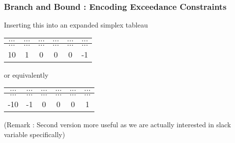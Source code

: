 \documentclass{beamer}
\begin{document}
\begin{frame}
	\frametitle{Branch and Bound : Encoding Exceedance Constraints}
	\large
Inserting this into an expanded simplex tableau
\begin{center}
	\begin{tabular}{|c||c|c|c|c|c|}
		
		\hline  $\ldots$ &$\ldots$  & $\ldots$ &$\ldots$  &$\ldots$  &$\ldots$  \\ 
	\hline  $\ldots$ &$\ldots$  & $\ldots$ &$\ldots$  &$\ldots$  &$\ldots$  \\ 
		\hline 10 & 1  & 0 & 0 & 0 & -1 \\ 
		\hline 
	\end{tabular} 
\end{center}
or equivalently
\begin{center}
	\begin{tabular}{|c||c|c|c|c|c|}
		\hline  $\ldots$ &$\ldots$  & $\ldots$ &$\ldots$  &$\ldots$  &$\ldots$  \\ 
		\hline  $\ldots$ &$\ldots$  & $\ldots$ &$\ldots$  &$\ldots$  &$\ldots$  \\ 
		\hline -10 & -1  & 0 & 0 & 0 & 1 \\
		\hline 
	\end{tabular} 
\end{center}
(Remark : Second version more useful as we are actually interested in slack variable specifically)
\end{frame}
\end{document}
